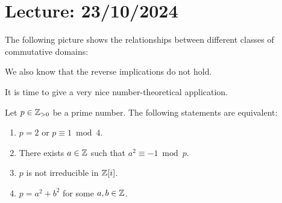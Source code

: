 \section{Lecture: 23/10/2024}

The following picture shows 
the relationships between 
different classes of commutative domains:
\begin{figure}[ht]
\centering
{}
\end{figure}

We also know that the  
reverse implications do not hold. 

It is time to give a very nice number-theoretical application.

\begin{theorem}[Fermat]
\label{thm:Fermat}
	Let $p\in\mathbb{Z}_{>0}$ be a prime number. The following statements are equivalent:
	\begin{enumerate}
	    \item $p=2$ or $p\equiv1\bmod 4$.
	    \item There exists $a\in\mathbb{Z}$ such that $a^2\equiv-1\bmod p$.
	    \item $p$ is not irreducible in $\mathbb{Z}[i]$.
	    \item $p=a^2+b^2$ for some $a,b\in\mathbb{Z}$.
	\end{enumerate}
\end{theorem}

